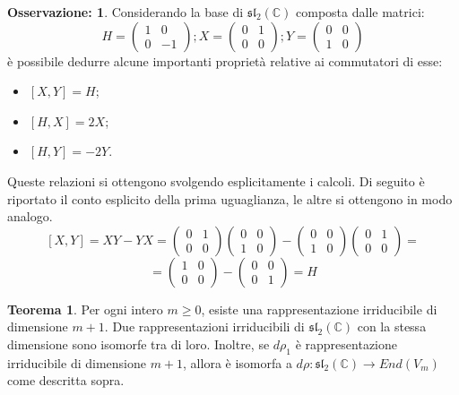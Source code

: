 \documentclass[12pt,a4paper]{report}
\theoremstyle{definition}
\newtheorem{Theo}[Def]{Teorema}
\theoremstyle{definition}
\theoremstyle{definition}
\theoremstyle{definition}
\newtheorem{Obs}[Def]{Osservazione:}
\begin{document}
\begin{Obs}\label{Obs1}
	Considerando la base di $\mathfrak{sl_2(\mathbb{C})}$ composta dalle matrici: $$H=
	\begin{pmatrix}
		1&0\\
		0&-1
	\end{pmatrix}; 
	X=\begin{pmatrix}
		0&1\\
		0&0
	\end{pmatrix};
	Y=\begin{pmatrix}
		0&0\\
		1&0
	\end{pmatrix}$$
è possibile dedurre alcune importanti proprietà relative ai commutatori di esse:
\begin{itemize}
	\item $[X,Y]=H$;
	\item $[H,X]=2X$;
	\item $[H,Y]=-2Y$.
\end{itemize}
Queste relazioni si ottengono svolgendo esplicitamente i calcoli. Di seguito è riportato il conto esplicito della prima uguaglianza, le altre si ottengono in modo analogo.
$$[X,Y]=XY-YX=\begin{pmatrix}
	0&1\\
	0&0
\end{pmatrix}
\begin{pmatrix}
	0&0\\
	1&0
\end{pmatrix}-
\begin{pmatrix}
	0&0\\
	1&0
\end{pmatrix}
\begin{pmatrix}
	0&1\\
	0&0
\end{pmatrix}=$$$$=
\begin{pmatrix}
1&0\\
0&0
\end{pmatrix}-\begin{pmatrix}
0&0\\
0&1
\end{pmatrix}=H$$
\end{Obs}
\begin{Theo}\label{Theo2}
	Per ogni intero $m\geq 0$, esiste una rappresentazione irriducibile di dimensione $m+1$. Due rappresentazioni irriducibili di $\mathfrak{sl_2(\mathbb{C})}$ con la stessa dimensione sono isomorfe tra di loro. Inoltre, se $d\rho_1$ è rappresentazione irriducibile di dimensione $m+1$, allora è isomorfa a $d\rho:\mathfrak{sl_2(\mathbb{C})}\rightarrow End(V_m)$ come descritta sopra.
\end{Theo}
\end{document}
